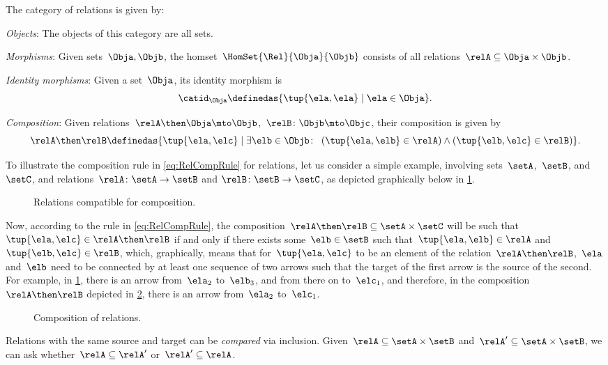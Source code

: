 \begin{ctdefinition}
  \label{def:Rel}
  The category of relations \iindex{\Rel}  is given by:
  \begin{compactenum}
    \item \emph{Objects}: The objects of this category are all sets.
    \item \emph{Morphisms}: Given sets~$\Obja, \Objb$, the homset~$\HomSet{\Rel}{\Obja}{\Objb}$ consists of all
    relations~$\relA\subseteq \Obja\times \Objb$.
    \item \emph{Identity morphisms}: Given a set~$\Obja$, its identity morphism is
    \begin{equation}
      \catid_\Obja \definedas \{ \tup{\ela,\ela} \mid  \ela \in \Obja \}.
    \end{equation}
    \item \emph{Composition}: Given relations~$\relA \then \Obja\mto \Objb$,~$\relB \colon \Objb\mto \Objc$, their composition is given by
    \begin{equation}
      \label{eq:RelCompRule}
      \relA \then \relB \definedas \{\tup{\ela,\elc} \mid  \exists \elb \in \Objb \colon \ \left(\tup{\ela,\elb} \in \relA\right) \wedge \left(\tup{\elb,\elc} \in \relB\right)\}.
    \end{equation}
  \end{compactenum}
\end{ctdefinition}

To illustrate the composition rule in \cref{eq:RelCompRule} for relations, let us consider a simple example, involving sets~$\setA$,~$\setB$, and~$\setC$, and relations~$\relA \colon \setA \to \setB$ and $\relB \colon \setB \to \setC$, as depicted graphically below in \cref{fig:example_rel_composable}.
%
\begin{figure}[h!]
  \centering
  \caption{Relations compatible for composition.}
  \label{fig:example_rel_composable}
\end{figure}
%
Now, according to the rule in \cref{eq:RelCompRule}, the composition~$\relA \then \relB \subseteq \setA \times \setC$ will be such that~$\tup{\ela,\elc} \in \relA \then \relB$ if and only if there exists some~$\elb \in \setB$ such that~$\tup{\ela,\elb} \in \relA$ and~$\tup{\elb,\elc} \in \relB$, which, graphically, means that for~$\tup{\ela,\elc}$ to be an element of the relation~$\relA \then \relB$,~$\ela$ and~$\elb$ need to be connected by at least one sequence of two arrows such that the target of the first arrow is the source of the second.
For example, in \cref{fig:example_rel_composable}, there is an arrow from~$\ela_2$ to~$\elb_3$, and from there on to~$\elc_1$, and therefore, in the composition~$\relA \then \relB$ depicted in \cref{fig:example_rel_composed}, there is an arrow from~$\ela_2$ to~$\elc_1$.
%
\begin{figure}[h!]
  \centering
  \caption{Composition of relations.}
  \label{fig:example_rel_composed}
\end{figure}

\begin{remark}
  Relations with the same source and target can be \emph{compared} via inclusion.
  Given~$\relA \subseteq \setA\times \setB$ and~$\relA'\subseteq \setA\times \setB$, we can ask whether~$\relA\subseteq \relA'$ or~$\relA'\subseteq \relA$.
\end{remark}
